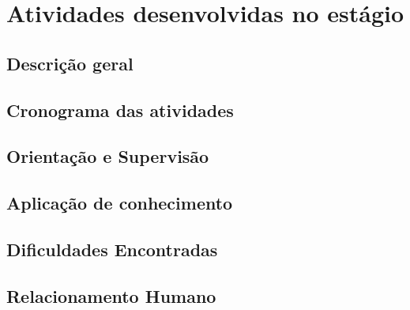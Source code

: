 \chapter{Atividades desenvolvidas no estágio}\label{ch:desenvolvimento}

\section{Descrição geral}\label{sec:descgeral}

\section{Cronograma das atividades}\label{sec:cronograma}

\section{Orientação e Supervisão}\label{sec:orientacao}

\section{Aplicação de conhecimento}\label{sec:aplicacao}

\section{Dificuldades Encontradas}\label{sec:dificuldades}

\section{Relacionamento Humano}\label{sec:relacionamento}

